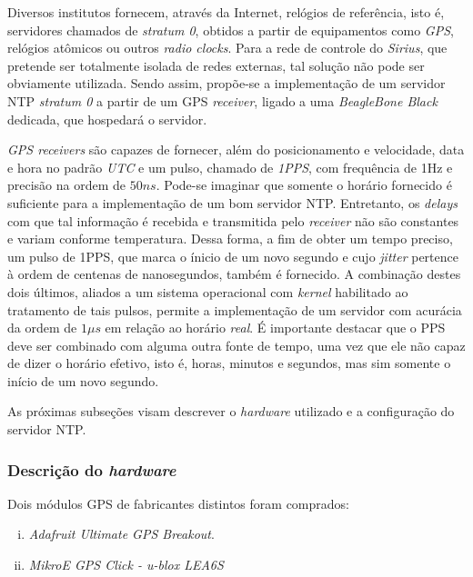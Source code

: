 \vspace{12pt}  

Diversos institutos fornecem, através da Internet, relógios de referência, isto
é, servidores chamados de \textit{stratum 0}, obtidos a partir de equipamentos
como \textit{GPS}, relógios atômicos ou outros \textit{radio clocks}. Para a rede
de controle do \textit{Sirius}, que pretende ser totalmente isolada de redes
externas, tal solução não pode ser obviamente utilizada. Sendo assim, propõe-se
a implementação de um servidor NTP \textit{stratum 0} a partir de um GPS
\textit{receiver}, ligado a uma \textit{BeagleBone Black} dedicada, que
hospedará o servidor.

\vspace{12pt}

\textit{GPS receivers} são capazes de fornecer, além do posicionamento e
velocidade, data e hora no padrão \textit{UTC} e um pulso, chamado de
\textit{1PPS}, com frequência de 1Hz e precisão na ordem de \(50ns\). Pode-se
imaginar que somente o horário fornecido é suficiente para a implementação de um
bom servidor NTP. Entretanto, os \textit{delays} com que tal informação é
recebida e transmitida pelo \textit{receiver} não são constantes e variam
conforme temperatura. Dessa forma, a fim de obter um tempo preciso, um pulso de
1PPS, que marca o ínicio de um novo segundo e cujo \textit{jitter} pertence à
ordem de centenas de nanosegundos, também é fornecido.
A combinação destes dois últimos, aliados a um sistema operacional com
\textit{kernel} habilitado ao tratamento de tais pulsos, permite a implementação
de um servidor com acurácia da ordem de \(1\mu s\) em relação ao horário
\textit{real}. É importante destacar que o PPS deve ser combinado com
alguma outra fonte de tempo, uma vez que ele não capaz de dizer o horário
efetivo, isto é, horas, minutos e segundos, mas sim somente o início de um novo
segundo.

\vspace{12pt}

As próximas subseções visam descrever o \textit{hardware} utilizado e a
configuração do servidor NTP.

\subsubsection{Descrição do \textit{hardware}}

Dois módulos GPS de fabricantes distintos foram comprados:

\begin{enumerate}[i.]
  \item \textit{Adafruit Ultimate GPS Breakout}.
  \item \textit{MikroE GPS Click - u-blox LEA6S}
\end{enumerate}

